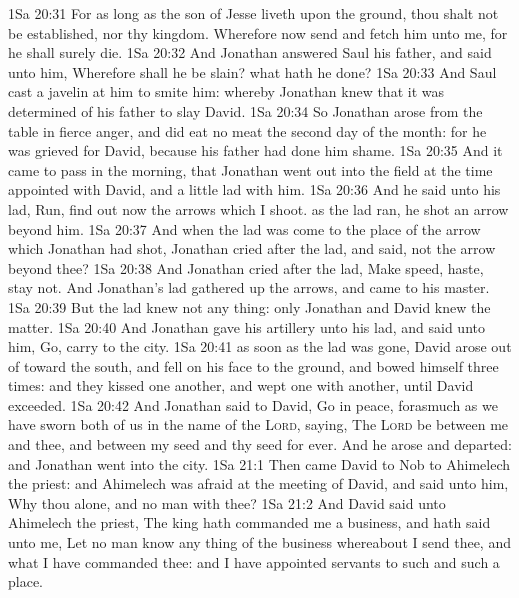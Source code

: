 \vs 1Sa 20:31 For as long as the son of Jesse liveth upon the ground, thou shalt not be established, nor thy kingdom. Wherefore now send and fetch him unto me, for he shall surely die.
\vs 1Sa 20:32 And Jonathan answered Saul his father, and said unto him, Wherefore shall he be slain? what hath he done?
\vs 1Sa 20:33 And Saul cast a javelin at him to smite him: whereby Jonathan knew that it was determined of his father to slay David.
\vs 1Sa 20:34 So Jonathan arose from the table in fierce anger, and did eat no meat the second day of the month: for he was grieved for David, because his father had done him shame.
\vs 1Sa 20:35 And it came to pass in the morning, that Jonathan went out into the field at the time appointed with David, and a little lad with him.
\vs 1Sa 20:36 And he said unto his lad, Run, find out now the arrows which I shoot.  as the lad ran, he shot an arrow beyond him.
\vs 1Sa 20:37 And when the lad was come to the place of the arrow which Jonathan had shot, Jonathan cried after the lad, and said,  not the arrow beyond thee?
\vs 1Sa 20:38 And Jonathan cried after the lad, Make speed, haste, stay not. And Jonathan's lad gathered up the arrows, and came to his master.
\vs 1Sa 20:39 But the lad knew not any thing: only Jonathan and David knew the matter.
\vs 1Sa 20:40 And Jonathan gave his artillery unto his lad, and said unto him, Go, carry  to the city.
\vs 1Sa 20:41  as soon as the lad was gone, David arose out of  toward the south, and fell on his face to the ground, and bowed himself three times: and they kissed one another, and wept one with another, until David exceeded.
\vs 1Sa 20:42 And Jonathan said to David, Go in peace, forasmuch as we have sworn both of us in the name of the \textsc{Lord}, saying, The \textsc{Lord} be between me and thee, and between my seed and thy seed for ever. And he arose and departed: and Jonathan went into the city.
\vs 1Sa 21:1 Then came David to Nob to Ahimelech the priest: and Ahimelech was afraid at the meeting of David, and said unto him, Why  thou alone, and no man with thee?
\vs 1Sa 21:2 And David said unto Ahimelech the priest, The king hath commanded me a business, and hath said unto me, Let no man know any thing of the business whereabout I send thee, and what I have commanded thee: and I have appointed  servants to such and such a place.
